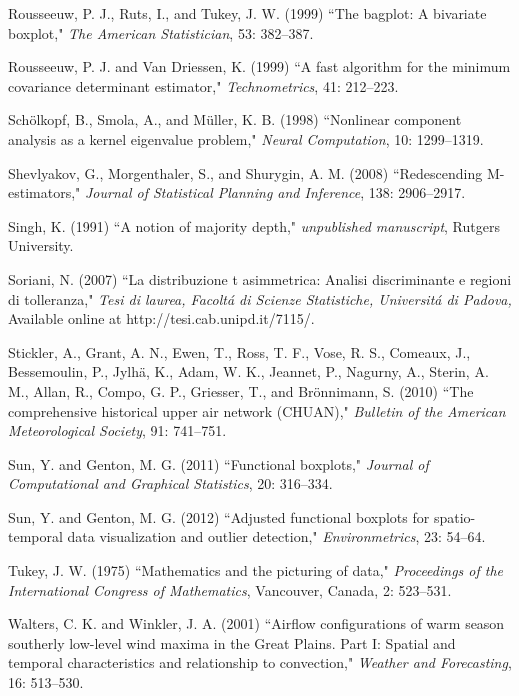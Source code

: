\documentclass[12pt]{article}
\def\JCGS{{\it Journal of Computational and Graphical Statistics}}
\def\JCGS{{\it Journal of Computational and Graphical Statistics}}
\def\refhg{\hangindent=20pt\hangafter=1}
\def\refmark{\par\vskip 2mm\noindent\refhg}
\def\refhg{\hangindent=20pt\hangafter=1}
\def\refmark{\par\vskip 2mm\noindent\refhg}
\begin{document}
\refmark Rousseeuw, P. J., Ruts, I., and Tukey, J. W. (1999) ``The bagplot: A bivariate boxplot," \emph{The American Statistician}, 53: 382--387.


\refmark Rousseeuw, P. J. and Van Driessen, K. (1999) ``A fast algorithm for the minimum covariance determinant estimator," \emph{Technometrics}, 41:  212--223.


\refmark Sch\"{o}lkopf, B., Smola, A., and M\"{u}ller, K. B. (1998) ``Nonlinear component analysis as a kernel eigenvalue problem," \emph{Neural Computation}, 10: 1299--1319.

\refmark Shevlyakov, G., Morgenthaler, S., and Shurygin, A. M. (2008) ``Redescending M-estimators,"  \emph{Journal of  Statistical Planning and  Inference}, 138: 2906--2917.

\refmark Singh, K. (1991) ``A notion of majority depth," \emph{unpublished manuscript}, Rutgers University. 

\refmark Soriani, N. (2007) ``La distribuzione t asimmetrica: Analisi discriminante e regioni di tolleranza," \emph{Tesi di laurea, Facolt\'{a} di Scienze Statistiche, Universit\'{a} di Padova,} Available online at http://tesi.cab.unipd.it/7115/.

\refmark Stickler, A., Grant, A. N., Ewen, T., Ross, T. F., Vose, R. S., Comeaux, J., Bessemoulin, P., Jylh\"{a}, K., Adam, W. K., Jeannet, P., Nagurny, A., Sterin, A. M., Allan, R., Compo, G. P., Griesser, T., and Br\"{o}nnimann, S. (2010) ``The comprehensive historical upper air network (CHUAN)," \emph{Bulletin of the American Meteorological Society}, 91: 741--751.

\refmark Sun, Y. and Genton, M. G. (2011) ``Functional boxplots," \JCGS, 20: 316--334. 

\refmark Sun, Y. and Genton, M. G. (2012) ``Adjusted functional boxplots for spatio-temporal data visualization and outlier detection," {\it Environmetrics}, 23: 54--64.

\refmark Tukey, J. W. (1975) ``Mathematics and the picturing of data," \emph{Proceedings of the International Congress of Mathematics}, Vancouver, Canada, 2: 523--531.


\refmark Walters, C. K. and Winkler, J. A. (2001) ``Airflow configurations of warm season southerly low-level wind maxima in the Great Plains.  Part I: Spatial and temporal characteristics and relationship to convection," \emph{Weather and Forecasting}, 16:  513--530.
\end{document}
